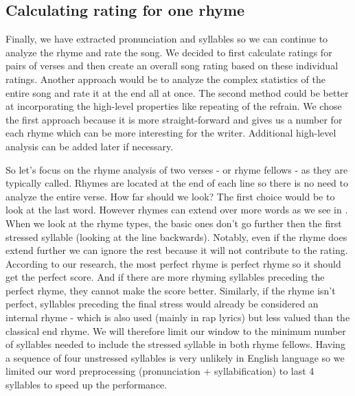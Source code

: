 \subsection{Calculating rating for one rhyme}
Finally, we have extracted pronunciation and syllables so we can continue to analyze the rhyme and rate the song. We decided to first calculate ratings for pairs of verses and then create an overall song rating based on these individual ratings. Another approach would be to analyze the complex statistics of the entire song and rate it at the end all at once. The second method could be better at incorporating the high-level properties like repeating of the refrain. We chose the first approach because it is more straight-forward and gives us a number for each rhyme which can be more interesting for the writer. Additional high-level analysis can be added later if necessary.

So let's focus on the rhyme analysis of two verses - or rhyme fellows - as they are typically called. Rhymes are located at the end of each line so there is no need to analyze the entire verse. How far should we look? The first choice would be to look at the last word. However rhymes can extend over more words as we see in . When we look at the rhyme types, the basic ones don't go further then the first stressed syllable (looking at the line backwards). Notably, even if the rhyme does extend further we can ignore the rest because it will not contribute to the rating. According to our research, the most perfect rhyme is perfect rhyme so it should get the perfect score. And if there are more rhyming syllables preceding the perfect rhyme, they cannot make the score better. Similarly, if the rhyme isn't perfect, syllables preceding the final stress would already be considered an internal rhyme - which is also used (mainly in rap lyrics) but less valued than the classical end rhyme. We will therefore limit our window to the minimum number of syllables needed to include the stressed syllable in both rhyme fellows. Having a sequence of four unstressed syllables is very unlikely in English language so we limited our word preprocessing (pronunciation + syllabification) to last 4 syllables to speed up the performance.

